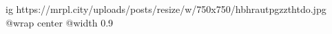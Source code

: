  
 
 
 
 

\ifcmt
  ig https://mrpl.city/uploads/posts/resize/w/750x750/hbhrautpgzzthtdo.jpg
  @wrap center
  @width 0.9
\fi
